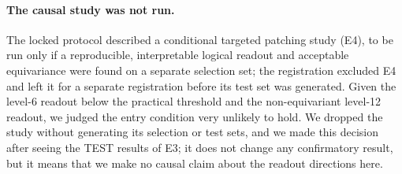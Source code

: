 \paragraph{The causal study was not run.} The locked protocol described a conditional targeted patching study (E4), to be run only if a reproducible, interpretable logical readout and acceptable equivariance were found on a separate selection set; the registration excluded E4 and left it for a separate registration before its test set was generated. Given the level-6 readout below the practical threshold and the non-equivariant level-12 readout, we judged the entry condition very unlikely to hold. We dropped the study without generating its selection or test sets, and we made this decision after seeing the TEST results of E3; it does not change any confirmatory result, but it means that we make no causal claim about the readout directions here.
